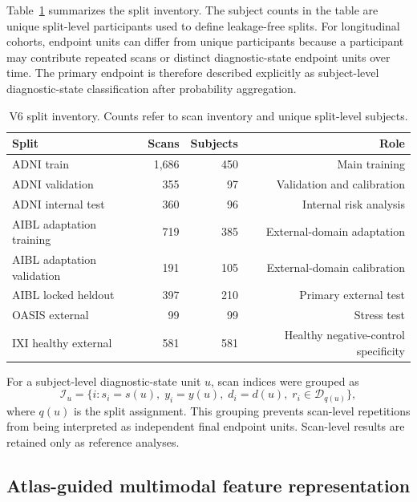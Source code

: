 Table~\ref{tab:v6_splits} summarizes the split inventory. The subject counts in the table are unique split-level participants used to define leakage-free splits. For longitudinal cohorts, endpoint units can differ from unique participants because a participant may contribute repeated scans or distinct diagnostic-state endpoint units over time. The primary endpoint is therefore described explicitly as subject-level diagnostic-state classification after probability aggregation.

\begin{table}[t]
\centering
\caption{V6 split inventory. Counts refer to scan inventory and unique split-level subjects.}
\label{tab:v6_splits}
\small
\begin{tabular}{@{}lrrr@{}}
\toprule
Split & Scans & Subjects & Role \\
\midrule
ADNI train & 1{,}686 & 450 & Main training \\
ADNI validation & 355 & 97 & Validation and calibration \\
ADNI internal test & 360 & 96 & Internal risk analysis \\
AIBL adaptation training & 719 & 385 & External-domain adaptation \\
AIBL adaptation validation & 191 & 105 & External-domain calibration \\
AIBL locked heldout & 397 & 210 & Primary external test \\
OASIS external & 99 & 99 & Stress test \\
IXI healthy external & 581 & 581 & Healthy negative-control specificity \\
\bottomrule
\end{tabular}
\end{table}

For a subject-level diagnostic-state unit $u$, scan indices were grouped as
\begin{equation}
\mathcal{I}_u =
\{i: s_i=s(u),\; y_i=y(u),\; d_i=d(u),\; r_i\in\mathcal{D}_{q(u)}\},
\label{eq:endpoint_group}
\end{equation}
where $q(u)$ is the split assignment. This grouping prevents scan-level repetitions from being interpreted as independent final endpoint units. Scan-level results are retained only as reference analyses.

\subsection{Atlas-guided multimodal feature representation}
\label{sec:features}

